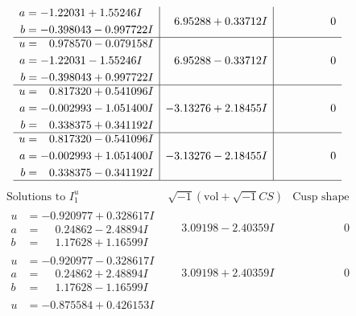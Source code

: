 \documentclass[1p]{elsarticle_modified}
\theoremstyle{definition}
\newcommand{\I}{\sqrt{-1}}
\begin{document}
$$\begin{array}{c|c|c}
\begin{aligned}
a &= -1.22031 + 1.55246 I \\
b &= -0.398043 - 0.997722 I\end{aligned}
 & \phantom{-}6.95288 + 0.33712 I & \phantom{-0.000000 } 0 \\ \hline\begin{aligned}
u &= \phantom{-}0.978570 - 0.079158 I \\
a &= -1.22031 - 1.55246 I \\
b &= -0.398043 + 0.997722 I\end{aligned}
 & \phantom{-}6.95288 - 0.33712 I & \phantom{-0.000000 } 0 \\ \hline\begin{aligned}
u &= \phantom{-}0.817320 + 0.541096 I \\
a &= -0.002993 - 1.051400 I \\
b &= \phantom{-}0.338375 + 0.341192 I\end{aligned}
 & -3.13276 + 2.18455 I & \phantom{-0.000000 } 0 \\ \hline\begin{aligned}
u &= \phantom{-}0.817320 - 0.541096 I \\
a &= -0.002993 + 1.051400 I \\
b &= \phantom{-}0.338375 - 0.341192 I\end{aligned}
 & -3.13276 - 2.18455 I & \phantom{-0.000000 } 0\\
 \hline 
 \end{array}$$\newpage$$\begin{array}{c|c|c}  
\text{Solutions to }I^u_{1}& \I (\text{vol} + \sqrt{-1}CS) & \text{Cusp shape}\\
 \hline 
\begin{aligned}
u &= -0.920977 + 0.328617 I \\
a &= \phantom{-}0.24862 - 2.48894 I \\
b &= \phantom{-}1.17628 + 1.16599 I\end{aligned}
 & \phantom{-}3.09198 - 2.40359 I & \phantom{-0.000000 } 0 \\ \hline\begin{aligned}
u &= -0.920977 - 0.328617 I \\
a &= \phantom{-}0.24862 + 2.48894 I \\
b &= \phantom{-}1.17628 - 1.16599 I\end{aligned}
 & \phantom{-}3.09198 + 2.40359 I & \phantom{-0.000000 } 0 \\ \hline\begin{aligned}
u &= -0.875584 + 0.426153 I \\

\end{aligned}
\end{array}$$
\end{document}
